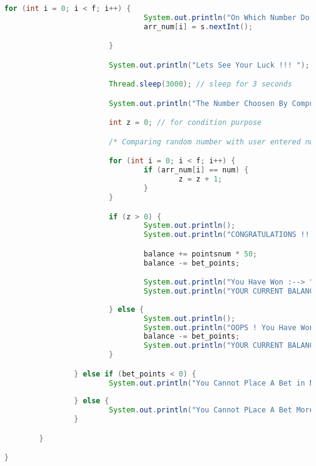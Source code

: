 \documentclass[]{article}
\begin{document}
\begin{lstlisting}[language=Java]
                        for (int i = 0; i < f; i++) {
                                System.out.println("On Which Number Do You Want To Place Your Bet :- ");
                                arr_num[i] = s.nextInt();

                        }

                        System.out.println("Lets See Your Luck !!! ");

                        Thread.sleep(3000); // sleep for 3 seconds

                        System.out.println("The Number Choosen By Computer :- " + num);

                        int z = 0; // for condition purpose

                        /* Comparing random number with user entered number */

                        for (int i = 0; i < f; i++) {
                                if (arr_num[i] == num) {
                                        z = z + 1;
                                }
                        }

                        if (z > 0) {
                                System.out.println();
                                System.out.println("CONGRATULATIONS !!!!");

                                balance += pointsnum * 50;
                                balance -= bet_points;

                                System.out.println("You Have Won :--> " + pointsnum * 50);
                                System.out.println("YOUR CURRENT BALANCE --> " + balance);
                                
                        } else {
                                System.out.println();
                                System.out.println("OOPS ! You Have Won Nothing !!");
                                balance -= bet_points;
                                System.out.println("YOUR CURRENT BALANCE --> " + balance);
                        }

                } else if (bet_points < 0) {
                        System.out.println("You Cannot Place A Bet in Negative");
                        
                } else {
                        System.out.println("You Cannot PLace A Bet More Than Your Current Balance ");
                }

        }

}

\end{lstlisting}
\end{document}
